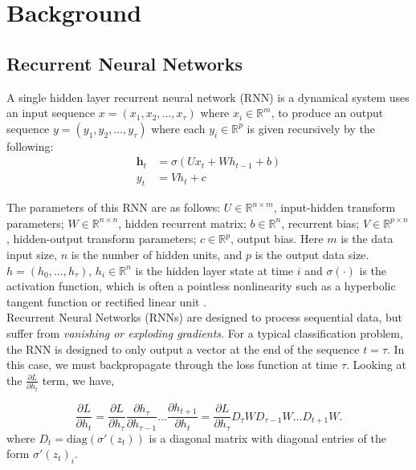 \documentclass[letterpaper]{article} %
\begin{document}
\section{Background}
\subsection{Recurrent Neural Networks}
\noindent A single hidden layer recurrent neural network (RNN) is a dynamical system uses an input sequence $x = (x_1, x_2, ... , x_{\tau})$ where $x_i \in \mathbb{R}^m$, to produce an output sequence $y = (y_1, y_2, ... , y_{\tau})$ where each $y_i \in \mathbb{R}^p$ is given recursively by the following: 
\begin{align*}
\textbf{h}_t & = \sigma \left(Ux_t + W h_{t-1} + b\right) \\
y_t & = Vh_t + c
\end{align*}

\noindent The parameters of this RNN are as follows:  $U \in \mathbb{R}^{n \times m}$, input-hidden transform parameters; $W \in \mathbb{R}^{n \times n}$, hidden recurrent matrix; $b \in \mathbb{R}^n$, recurrent bias; $V \in \mathbb{R}^{p \times n}$, hidden-output transform parameters; $c \in \mathbb{R}^p$, output bias.  Here $m$ is the data input size, $n$ is the number of hidden units, and $p$ is the output data size. $h = (h_0, \ldots, h_{\tau})$, $h_i \in \mathbb{R}^n$ is the hidden layer state at time $i$ and $\sigma(\cdot)$ is the activation function, which is often a pointless nonlinearity such as a hyperbolic tangent function or rectified linear unit \cite{Nair10}.\\

\noindent Recurrent Neural Networks (RNNs) are designed to process sequential data, but suffer from \textit{vanishing or exploding gradients}. For a typical classification problem, the RNN is designed to only output a vector at the end of the sequence $t = \tau$.  In this case, we must backpropagate through the loss function at time $\tau$.  Looking at the $\frac{\partial L}{\partial h_t}$ term, we have,

\[
	\frac{\partial L}{\partial h_t} = \frac{\partial L}{\partial h_{\tau}}\frac{\partial h_{\tau}}{\partial h_{\tau-1}}...\frac{\partial h_{t+1}}{\partial h_{t}} = \frac{\partial L}{\partial h_{\tau}}D_{\tau}WD_{\tau-1}W ... D_{t+1}W.  
\]
where $D_t = \text{diag}\left(\sigma'\left(z_t \right)\right)$ is a diagonal matrix with diagonal entries of the form $\sigma'\left(z_t\right)_i$.
\end{document}
